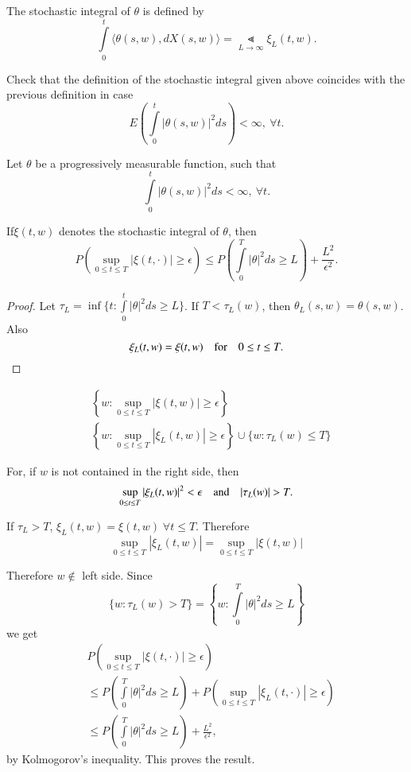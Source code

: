 \begin{defi*}
The stochastic integral of $\theta$ is defined by
$$
\int\limits^{t}_{0}\langle \theta(s,w),dX(s,w)\rangle
=\Lt\limits_{L\to \infty}\xi_{L}(t,w).
$$
\end{defi*}

\begin{exer*}
Check that the definition of the stochastic integral given above
coincides with the previous definition in case
$$
E\left(\int\limits^{t}_{0}|\theta(s,w)|^{2}ds\right)<\infty,\ \forall t.
$$
\end{exer*}

\begin{lemma*}
Let $\theta$ be a progressively measurable function, such that
$$
\int\limits^{t}_{0}|\theta(s,w)|^{2}ds<\infty,\ \forall t.
$$

If\pageoriginale $\xi(t,w)$ denotes the stochastic integral of
$\theta$, then
$$
P\left(\sup\limits_{0\leq t\leq T}|\xi(t,\cdot)|\geq
\epsilon\right)\leq P\left(\int\limits^{T}_{0}|\theta|^{2}ds\geq
L\right)+\frac{L^{2}}{\epsilon^{2}}. 
$$
\end{lemma*}

\begin{proof}
Let $\tau_{L}=\inf \{t:\int\limits^{t}_{0}|\theta|^{2}ds\geq L\}$. If
$T<\tau_{L}(w)$, then $\theta_{L}(s,w)=\theta(s,w)$. Also
$$
\xi_{L}(t,w)=\xi(t,w)\quad\text{for}\quad 0\leq t\leq T.
$$
\end{proof}

\begin{claim*}
\begin{align*}
& \left\{w:\sup\limits_{0\leq t\leq T}|\xi(t,w)|\geq
  \epsilon\right\}\\
& \left\{w:\sup\limits_{0\leq t\leq T}|\xi_{L}(t,w)|\geq
  \epsilon\right\}\cup \{w:\tau_{L}(w)\leq T\}
\end{align*}

For, if $w$ is not contained in the right side, then
$$
\sup\limits_{0\leq t\leq T}|\xi_{L}(t,w)|^{2}<\epsilon\q\text{and}\q
|\tau_{L}(w)|>T. 
$$

If $\tau_{L}>T$, $\xi_{L}(t,w)=\xi(t,w)\;\forall t\leq T$. Therefore
$$
\sup\limits_{0\leq t\leq T}|\xi_{L}(t,w)|=\sup\limits_{0\leq t\leq T}|\xi(t,w)|
$$

Therefore $w\not\in$ left side. Since
$$
\{w:\tau_{L}(w)>T\}=\left\{w:\int\limits^{T}_{0}|\theta|^{2}ds\geq
L\right\}
$$
we get
\begin{align*}
& P\left(\sup\limits_{0\leq t\leq T}|\xi(t,\cdot)|\geq \epsilon\right)\\
& \leq P\left(\int\limits^{T}_{0}|\theta|^{2}ds\geq
  L\right)+P\left(\sup\limits_{0\leq t\leq T}|\xi_{L}(t,\cdot)|\geq
  \epsilon\right)\\
&\leq P\left(\int\limits^{T}_{0}|\theta|^{2}ds\geq
  L\right)+\frac{L^{2}}{\epsilon^{2}}, 
\end{align*}\pageoriginale
by Kolmogorov's inequality. This proves the result.
\end{claim*}

